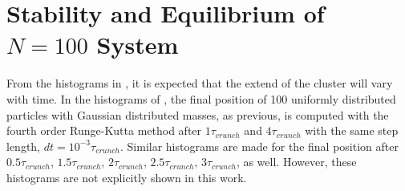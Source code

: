 \section{Stability and Equilibrium of $N=100$ System}
\label{sec:StabilityAndEquilibrium}
From the histograms in , it is expected that the extend of the cluster will vary with time. 
In the histograms of , the final position of 100 uniformly distributed particles with Gaussian distributed masses, as previous, is computed with the fourth order Runge-Kutta method after $1\tau_{crunch}$ and $4\tau_{crunch}$ with the same step length, $dt = 10^{-3} \tau_{crunch}$. 
Similar histograms are made for the final position after $0.5\tau_{crunch}$, $1.5\tau_{crunch}$, $2\tau_{crunch}$, $2.5\tau_{crunch}$, $3\tau_{crunch}$, as well. 
However, these histograms are not explicitly shown in this work. 
